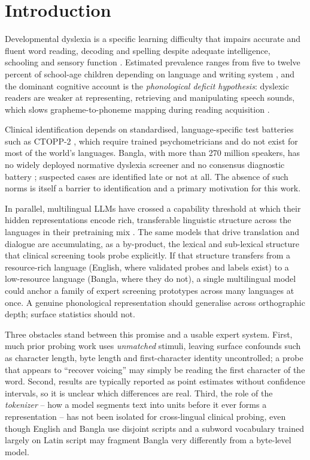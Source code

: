 \documentclass[preprint,12pt]{elsarticle}
\begin{document}
\section{Introduction}
\label{sec:intro}
Developmental dyslexia is a specific learning difficulty that impairs accurate and fluent word reading, decoding and spelling despite adequate intelligence, schooling and sensory function \cite{snowling2020dyslexia,peterson2012developmental}. Estimated prevalence ranges from five to twelve percent of school-age children depending on language and writing system \cite{ziegler2005reading,wagner2020prevalence}, and the dominant cognitive account is the \emph{phonological deficit hypothesis}: dyslexic readers are weaker at representing, retrieving and manipulating speech sounds, which slows grapheme-to-phoneme mapping during reading acquisition \cite{snowling2020dyslexia,goswami2011temporal}.

Clinical identification depends on standardised, language-specific test batteries such as CTOPP-2 \cite{wagner2013ctopp}, which require trained psychometricians and do not exist for most of the world's languages. Bangla, with more than 270 million speakers, has no widely deployed normative dyslexia screener and no consensus diagnostic battery \cite{nag2014dyslexia,nag2017indian,badsha2024mall}; suspected cases are identified late or not at all. The absence of such norms is itself a barrier to identification and a primary motivation for this work.

In parallel, multilingual LLMs have crossed a capability threshold at which their hidden representations encode rich, transferable linguistic structure across the languages in their pretraining mix \cite{conneau2020xlmr,scao2022bloom,xue2021mt5}. The same models that drive translation and dialogue are accumulating, as a by-product, the lexical and sub-lexical structure that clinical screening tools probe explicitly. If that structure transfers from a resource-rich language (English, where validated probes and labels exist) to a low-resource language (Bangla, where they do not), a single multilingual model could anchor a family of expert screening prototypes across many languages at once. A genuine phonological representation should generalise across orthographic depth; surface statistics should not.

Three obstacles stand between this promise and a usable expert system. First, much prior probing work uses \emph{unmatched} stimuli, leaving surface confounds such as character length, byte length and first-character identity uncontrolled; a probe that appears to ``recover voicing'' may simply be reading the first character of the word. Second, results are typically reported as point estimates without confidence intervals, so it is unclear which differences are real. Third, the role of the \emph{tokenizer} -- how a model segments text into units before it ever forms a representation -- has not been isolated for cross-lingual clinical probing, even though English and Bangla use disjoint scripts and a subword vocabulary trained largely on Latin script may fragment Bangla very differently from a byte-level model.
\end{document}
